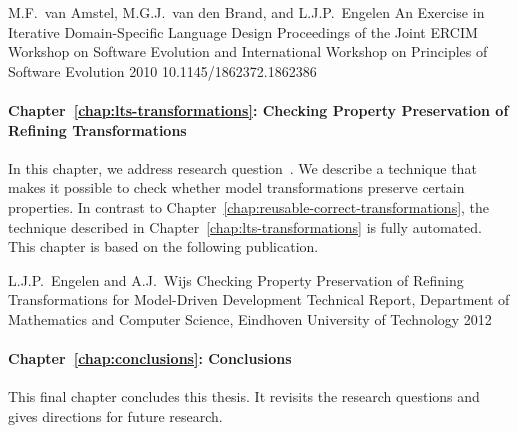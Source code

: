 {M.F.\ van Amstel, M.G.J.\ van den Brand, and L.J.P.\ Engelen}
{An Exercise in Iterative Domain-Specific Language Design}
{Proceedings of the Joint ERCIM Workshop on Software Evolution and International Workshop on Principles of Software Evolution}
{2010}
{10.1145/1862372.1862386}

\paragraph{Chapter~\ref{chap:lts-transformations}: Checking Property Preservation of Refining Transformations}
In this chapter, we address research question~.
We describe a technique that makes it possible to check whether model transformations preserve certain properties.
In contrast to Chapter~\ref{chap:reusable-correct-transformations}, the technique described in Chapter~\ref{chap:lts-transformations} is fully automated.
This chapter is based on the following publication.

{L.J.P.\ Engelen and A.J.\ Wijs}
{Checking Property Preservation of Refining Transformations for Model-Driven Development}
{Technical Report, Department of Mathematics and Computer Science, Eindhoven University of Technology}
{2012}
{}

\paragraph{Chapter~\ref{chap:conclusions}: Conclusions}
This final chapter concludes this thesis.
It revisits the research questions and gives directions for future research.


